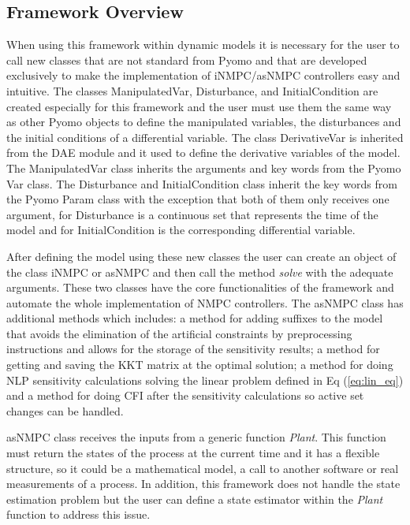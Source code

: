 \documentclass{article}
\begin{document}
\subsection{Framework Overview}
When using this framework  within dynamic models it is necessary for the user to call new classes that are not standard from Pyomo and that are developed exclusively to make the implementation of iNMPC/asNMPC controllers easy and intuitive.
The classes ManipulatedVar, Disturbance, and InitialCondition are created especially for this framework and the user must use them the same way as other Pyomo objects to define the manipulated variables, the disturbances and the initial conditions of a differential variable.
The class DerivativeVar is inherited from the DAE module and it used to define the derivative variables of the model.
The ManipulatedVar class inherits the arguments and key words from the Pyomo Var class.
The Disturbance and InitialCondition class inherit the key words from the Pyomo Param class with the exception that both of them only receives one argument, for Disturbance is a continuous set that represents the time of the model and for InitialCondition is the corresponding differential variable.
\par
After defining the model using these new classes the user can create an object of the class iNMPC or asNMPC and then call the method \textit{solve} with the adequate arguments.
These two classes have the core functionalities of the framework and automate the whole implementation of NMPC controllers.
The asNMPC class has additional methods which includes: a method for adding suffixes to the model that avoids the elimination of the artificial constraints by preprocessing instructions and allows for the storage of the sensitivity results; a method for getting and saving the KKT matrix at the optimal solution; a method for doing NLP sensitivity calculations solving the linear problem defined in Eq (\ref{eq:lin_eq}) and a method for doing CFI after the sensitivity calculations so active set changes can be handled.
\par
asNMPC class receives the inputs from a generic function \textit{Plant}.
This function must return the states of the process at the current time and it has a flexible structure, so it could be a mathematical model, a call to another software or real measurements of a process.
In addition, this framework does not handle the state estimation problem but the user can define a state estimator within the \textit{Plant} function to address this issue.
\par
\end{document}
